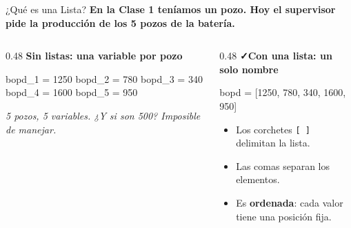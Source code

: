\documentclass[aspectratio=169, 11pt]{beamer}
\begin{document}
\begin{frame}[fragile,shrink=10]{¿Qué es una Lista?}
  \vspace{-4pt}
  {\small\color{arcaDark}\bfseries
    En la Clase 1 teníamos \textbf{un} pozo. Hoy el supervisor pide la producción de los \textbf{5 pozos} de la batería.}

  \vspace{5pt}
  \begin{columns}[T]
    \begin{column}{0.48\textwidth}
      {\scriptsize\color{arcaRed}\bfseries\faTimes\hspace{3pt}Sin listas: una variable por pozo}
      \begin{pyblock}
bopd_1 = 1250
bopd_2 = 780
bopd_3 = 340
bopd_4 = 1600
bopd_5 = 950
      \end{pyblock}
      \vspace{2pt}
      {\scriptsize\color{textMuted}\itshape
        5 pozos, 5 variables. ¿Y si son 500?
        Imposible de manejar.}
    \end{column}

    \begin{column}{0.48\textwidth}
      {\scriptsize\color{codeGreen}\bfseries\faCheck\hspace{3pt}Con una lista: un solo nombre}
      \begin{pyblock}
bopd = [1250, 780, 340, 1600, 950]
      \end{pyblock}
      \vspace{2pt}
      {\scriptsize\color{textMuted}
      \begin{itemize}\setlength{\itemsep}{2pt}
        \item[{\color{arcaRed}\scriptsize\faArrowRight}]
          Los corchetes \texttt{[ ]} delimitan la lista.
        \item[{\color{arcaRed}\scriptsize\faArrowRight}]
          Las comas separan los elementos.
        \item[{\color{arcaRed}\scriptsize\faArrowRight}]
          Es \textbf{ordenada}: cada valor tiene
          una posición fija.
      \end{itemize}
      }
    \end{column}
  \end{columns}
\end{frame}
\end{document}
